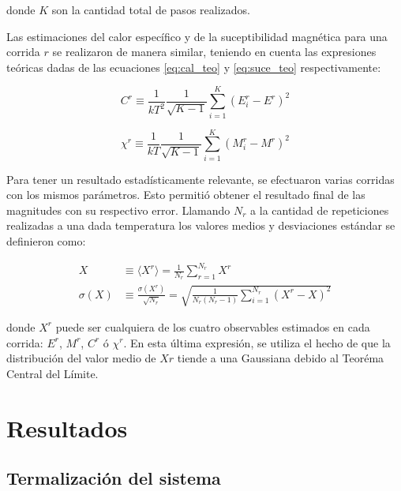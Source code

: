 \documentclass[a4paper,12pt]{article}
\begin{document}
\noindent donde $K$ son la cantidad total de pasos realizados.

Las estimaciones del calor específico y de la suceptibilidad magnética para una 
corrida $r$ se realizaron de manera similar, teniendo en cuenta las expresiones 
teóricas dadas de las ecuaciones \eqref{eq:cal_teo} y \eqref{eq:suce_teo} 
respectivamente:

\begin{equation}
 C^r \equiv  \frac{1}{kT^2} \frac{1}{\sqrt{K-1}} \sum_{i=1}^K \left(
 E_i^r - E^r \right)^2
\end{equation}

\begin{equation}
 \chi^r \equiv  \frac{1}{kT} \frac{1}{\sqrt{K-1}} \sum_{i=1}^K \left(
 M_i^r -  M^r \right)^2
\end{equation}

Para tener un resultado estadísticamente relevante, se efectuaron varias 
corridas con los mismos parámetros. Esto permitió obtener el resultado final de 
las magnitudes con su respectivo error. Llamando $N_r$ a la cantidad de 
repeticiones realizadas a una dada temperatura los valores medios y 
desviaciones estándar se definieron como:

\begin{subequations}
\begin{align}
X & \equiv \langle X^r \rangle = \frac{1}{N_r} 
\sum_{r=1}^{N_r} X^r \\
\sigma(X) & \equiv \frac{\sigma(X^r)}{\sqrt{N_r}} =  \sqrt{\frac{1}{N_r(N_r-1)} 
\sum_{i=1}^{N_r} \left( 
 X^r -  X \right)^2}
\end{align}
\end{subequations}

\noindent donde $X^r$ puede ser cualquiera de los cuatro observables estimados 
en cada corrida: $E^r$, $M^r$, $C^r$ ó $\chi^r$. En esta última expresión, se 
utiliza el hecho de que la distribución del valor medio de $Xr$ tiende a una 
Gaussiana debido al Teoréma Central del Límite.



\section{Resultados}

\subsection{Termalización del sistema}
\end{document}

